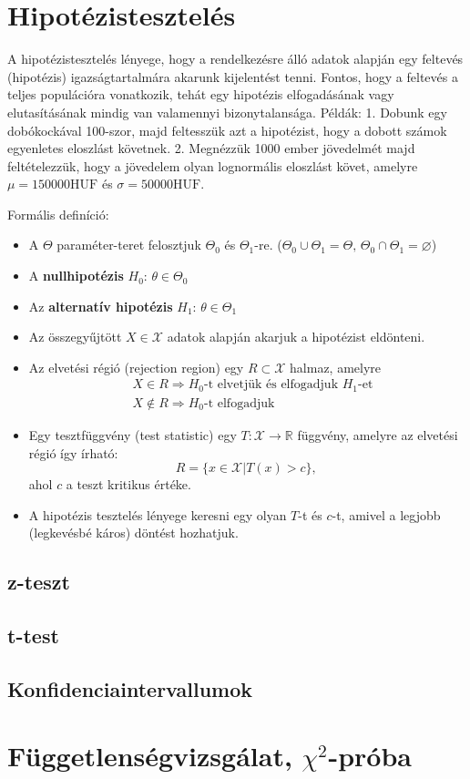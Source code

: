 \documentclass[12pt]{article}
\theoremstyle{plain}
\begin{document}
\section{Hipotézistesztelés}
A hipotézistesztelés lényege, hogy a rendelkezésre álló adatok alapján egy feltevés (hipotézis) igazságtartalmára akarunk
kijelentést tenni. Fontos, hogy a feltevés a teljes populációra vonatkozik, tehát egy hipotézis elfogadásának vagy elutasításának
mindig van valamennyi bizonytalansága. Példák: 1. Dobunk egy dobókockával 100-szor, majd feltesszük azt a hipotézist, hogy 
a dobott számok egyenletes eloszlást követnek. 2. Megnézzük 1000 ember jövedelmét majd feltételezzük, hogy a jövedelem olyan
lognormális eloszlást követ, amelyre $\mu=150000\text{HUF}$ és $\sigma=50000\text{HUF}$.
\par Formális definíció:
\begin{itemize}
    \item A $\Theta$ paraméter-teret felosztjuk $\Theta_0$ és $\Theta_1$-re. ($\Theta_0\cup\Theta_1=\Theta,\, \Theta_0\cap\Theta_1=\varnothing$)
    \item A \textbf{nullhipotézis}  $H_0:\, \theta\in\Theta_0$
    \item Az \textbf{alternatív hipotézis}  $H_1:\, \theta\in\Theta_1$
    \item Az összegyűjtött $X\in\mathcal X$ adatok alapján akarjuk a hipotézist eldönteni.
    \item Az elvetési régió (rejection region) egy $R\subset \mathcal X$ halmaz, amelyre
        \begin{align*}
            & X\in R \Rightarrow \text{$H_0$-t elvetjük és elfogadjuk $H_1$-et} \\
            & X\notin R \Rightarrow \text{$H_0$-t elfogadjuk}
        \end{align*}
    \item Egy tesztfüggvény (test statistic) egy $T: \mathcal X \rightarrow \mathbb R$ függvény, amelyre az elvetési
    régió így írható: 
        \begin{equation*}
            R = \{x \in \mathcal X | T(x) > c \} \text{, }
        \end{equation*}
    ahol $c$ a teszt kritikus értéke.
    \item A hipotézis tesztelés lényege keresni egy olyan $T$-t és $c$-t, amivel a legjobb (legkevésbé káros) döntést
    hozhatjuk.
\end{itemize}
\subsection{z-teszt}
\subsection{t-test}
\subsection{Konfidenciaintervallumok}

\section{Függetlenségvizsgálat, $\chi^2$-próba}



\end{document}
